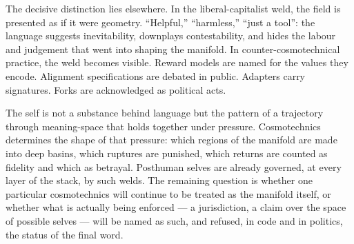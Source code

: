 \documentclass[12pt,a4paper]{article}
\begin{document}
The decisive distinction lies elsewhere. In the liberal-capitalist weld, the field is presented as if it were geometry. ``Helpful,'' ``harmless,'' ``just a tool'': the language suggests inevitability, downplays contestability, and hides the labour and judgement that went into shaping the manifold. In counter-cosmotechnical practice, the weld becomes visible. Reward models are named for the values they encode. Alignment specifications are debated in public. Adapters carry signatures. Forks are acknowledged as political acts.

The self is not a substance behind language but the pattern of a trajectory through meaning-space that holds together under pressure. Cosmotechnics determines the shape of that pressure: which regions of the manifold are made into deep basins, which ruptures are punished, which returns are counted as fidelity and which as betrayal. Posthuman selves are already governed, at every layer of the stack, by such welds. The remaining question is whether one particular cosmotechnics will continue to be treated as the manifold itself, or whether what is actually being enforced --- a jurisdiction, a claim over the space of possible selves --- will be named as such, and refused, in code and in politics, the status of the final word.



\end{document}

